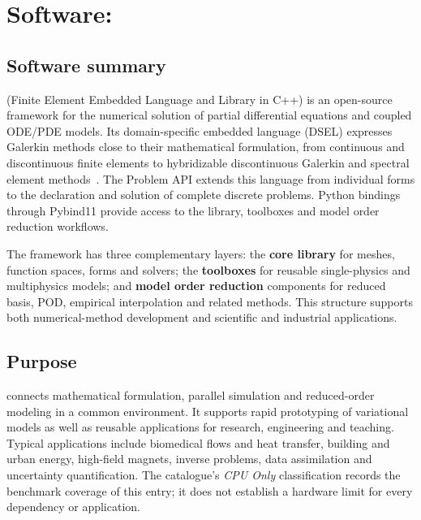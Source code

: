 \begingroup
\setlength{\emergencystretch}{3em}

\section{Software: \texorpdfstring{\Feelpp}{Feel++}}
\label{sec:Feelpp:software}

\subsection{Software summary}
\label{sec:Feelpp:summary}
\Feelpp (Finite Element Embedded Language and Library in C++) is an open-source
 framework for the numerical solution of partial differential equations
and coupled ODE/PDE models. Its domain-specific embedded language (DSEL)
expresses Galerkin methods close to their mathematical formulation, from
continuous and discontinuous finite elements to hybridizable discontinuous
Galerkin and spectral element methods~\cite{prudhomme_feel_2012}. The Problem
API extends this language from individual forms to the declaration and
solution of complete discrete problems.
Python bindings through Pybind11 provide access to the library, toolboxes and
model order reduction workflows.

The framework has three complementary layers: the \textbf{core library} for
meshes, function spaces, forms and solvers; the \textbf{toolboxes} for reusable
single-physics and multiphysics models; and \textbf{model order reduction}
components for reduced basis, POD, empirical interpolation and related methods.
This structure supports both numerical-method development and scientific and
industrial applications.

\begin{FicheMetadataTable}
  \FrameworkIdentityRows
\end{FicheMetadataTable}

\subsection{Purpose}
\label{sec:Feelpp:purpose}
\Feelpp connects mathematical formulation, parallel simulation and reduced-order
modeling in a common environment. It supports rapid prototyping of variational
models as well as reusable applications for research, engineering and teaching.
Typical applications include biomedical flows and heat transfer, building and
urban energy, high-field magnets, inverse problems, data assimilation and
uncertainty quantification. The catalogue's \emph{CPU Only} classification records
the benchmark coverage of this entry; it does not establish a hardware limit for
every dependency or application.

